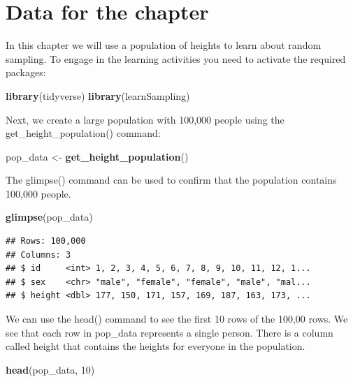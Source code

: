 \documentclass[
]{krantz}
\makeatletter
\newenvironment{Shaded}{\begin{snugshade}}{\end{snugshade}}
\newcommand{\DecValTok}[1]{\textcolor[rgb]{0.06,0.06,0.06}{#1}}
\newcommand{\KeywordTok}[1]{\textcolor[rgb]{0.27,0.27,0.27}{\textbf{#1}}}
\newcommand{\NormalTok}[1]{#1}
\newcommand{\StringTok}[1]{\textcolor[rgb]{0.5,0.5,0.5}{#1}}
\newenvironment{kframe}{%
\medskip{}
\setlength{\fboxsep}{.8em}
 \def\at@end@of@kframe{}%
 \ifinner\ifhmode%
  \def\at@end@of@kframe{\end{minipage}}%
  \begin{minipage}{\columnwidth}%
 \fi\fi%
 \def\FrameCommand##1{\hskip\@totalleftmargin \hskip-\fboxsep
 \colorbox{shadecolor}{##1}\hskip-\fboxsep
     \hskip-\linewidth \hskip-\@totalleftmargin \hskip\columnwidth}%
 \MakeFramed {\advance\hsize-\width
   \@totalleftmargin\z@ \linewidth\hsize
   \@setminipage}}%
 {\par\unskip\endMakeFramed%
 \at@end@of@kframe}
\renewenvironment{Shaded}{\begin{kframe}}{\end{kframe}}
\makeatother
\begin{document}
\hypertarget{data-for-the-chapter}{%
\section{Data for the chapter}\label{data-for-the-chapter}}

In this chapter we will use a population of heights to learn about random sampling. To engage in the learning activities you need to activate the required packages:

\begin{Shaded}
\begin{Highlighting}[]
\KeywordTok{library}\NormalTok{(tidyverse)}
\KeywordTok{library}\NormalTok{(learnSampling)}
\end{Highlighting}
\end{Shaded}

Next, we create a large population with 100,000 people using the get\_height\_population() command:

\begin{Shaded}
\begin{Highlighting}[]
\NormalTok{pop_data <-}\StringTok{ }\KeywordTok{get_height_population}\NormalTok{() }
\end{Highlighting}
\end{Shaded}

The glimpse() command can be used to confirm that the population contains 100,000 people.

\begin{Shaded}
\begin{Highlighting}[]
\KeywordTok{glimpse}\NormalTok{(pop_data)}
\end{Highlighting}
\end{Shaded}

\begin{verbatim}
## Rows: 100,000
## Columns: 3
## $ id     <int> 1, 2, 3, 4, 5, 6, 7, 8, 9, 10, 11, 12, 1...
## $ sex    <chr> "male", "female", "female", "male", "mal...
## $ height <dbl> 177, 150, 171, 157, 169, 187, 163, 173, ...
\end{verbatim}

We can use the head() command to see the first 10 rows of the 100,00 rows. We see that each row in pop\_data represents a single person. There is a column called height that contains the heights for everyone in the population.

\begin{Shaded}
\begin{Highlighting}[]
\KeywordTok{head}\NormalTok{(pop_data, }\DecValTok{10}\NormalTok{)}
\end{Highlighting}
\end{Shaded}
\end{document}
